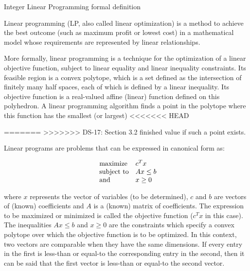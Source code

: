 \documentclass[9pt]{extarticle}
\begin{document}
    \begin{section}{Integer Linear Programming formal definition}

        Linear programming (LP, also called linear optimization) is a method to achieve the best outcome (such as maximum 
        profit or lowest cost) in a mathematical model whose requirements are represented by linear relationships.
        \cite{wiki:lp}

        More formally, linear programming is a technique for the optimization of a linear objective function, subject to 
        linear equality and linear inequality constraints. 
        Its feasible region is a convex polytope, which is a set defined as the intersection of finitely many half spaces, 
        each of which is defined by a linear inequality. 
        Its objective function is a real-valued affine (linear) function defined on this polyhedron. 
        A linear programming algorithm finds a point in the polytope where this function has the smallest (or largest) 
<<<<<<< HEAD

=======
>>>>>>> DS-17: Section 3.2 finished
        value if such a point exists. \cite{wiki:lp}
        \newpage

        Linear programs are problems that can be expressed in canonical form as:
        
        \begin{equation*}
            \begin{array}{ll@{}ll}
                \text{maximize}  & c^{T}x \\
                \text{subject to} & Ax \leq b \\
                \text{and} & x \ge 0
            \end{array}
        \end{equation*}

        where $x$ represents the vector of variables (to be determined), $c$ and $b$ are vectors of (known) coefficients and 
        $A$ is a (known) matrix of coefficients.
        The expression to be maximized or minimized is called the objective function ($c^{T}x$ in this case). 
        The inequalities $Ax \leq b$ and $x \ge 0$ are the constraints which specify a convex polytope over which the objective 
        function is to be optimized. 
        In this context, two vectors are comparable when they have the same dimensions. 
        If every entry in the first is less-than or equal-to the corresponding entry in the second, then it can be said 
        that the first vector is less-than or equal-to the second vector.
        \cite{wiki:lp}


\end{section}
\end{document}
